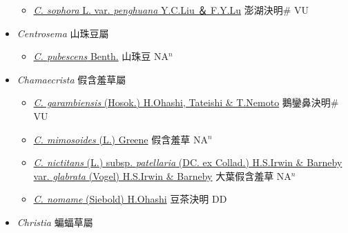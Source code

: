 \begin{itemize}
  \begin{itemize}
        \item[] \href{http://www.theplantlist.org/tpl1.1/search?q=Cassia+sophora+var.+penghuana}{\textit{C. sophora} L. var. \textit{penghuana} Y.C.Liu ＆ F.Y.Lu}   澎湖決明\# VU
  \end{itemize}
 \item[] \textit{Centrosema} 山珠豆屬
                    
  \begin{itemize}
        \item[] \href{http://www.theplantlist.org/tpl1.1/search?q=Centrosema+pubescens}{\textit{C. pubescens} Benth.}   山珠豆 NA$^n$
  \end{itemize}
 \item[] \textit{Chamaecrista} 假含羞草屬
                    
  \begin{itemize}
        \item[] \href{http://www.theplantlist.org/tpl1.1/search?q=Chamaecrista+garambiensis}{\textit{C. garambiensis} (Hosok.) H.Ohashi, Tateishi \& T.Nemoto}   鵝鑾鼻決明\# VU
        \item[] \href{http://www.theplantlist.org/tpl1.1/search?q=Chamaecrista+mimosoides}{\textit{C. mimosoides} (L.) Greene}   假含羞草 NA$^n$
        \item[] \href{http://www.theplantlist.org/tpl1.1/search?q=Chamaecrista+nictitans+subsp.+patellaria+var.+glabrata}{\textit{C. nictitans} (L.) subsp. \textit{patellaria} (DC. ex Collad.) H.S.Irwin \& Barneby var. \textit{glabrata} (Vogel) H.S.Irwin \& Barneby}   大葉假含羞草 NA$^n$
        \item[] \href{http://www.theplantlist.org/tpl1.1/search?q=Chamaecrista+nomame}{\textit{C. nomame} (Siebold) H.Ohashi}   豆茶決明 DD
  \end{itemize}
 \item[] \textit{Christia} 蝙蝠草屬
                    

\end{itemize}

